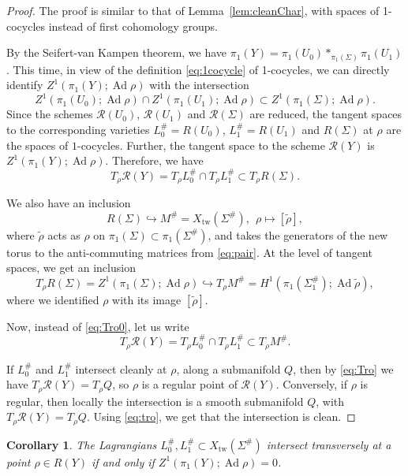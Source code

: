 \documentclass [11pt]{amsart}
\newtheorem {corollary}[theorem]{Corollary}
\theoremstyle{remark}
\def\Rep {R}
\def\Rs {\mathscr{R}}
\def\Ad {\operatorname{Ad}}
\def\Char {X}
\def\Xtw{\Char_{\operatorname{tw}}}
\begin{document}
\begin{proof}
The proof is similar to that of Lemma~\ref{lem:cleanChar}, with spaces of 1-cocycles instead of first cohomology groups.

By the Seifert-van Kampen theorem, we have $\pi_1(Y) = \pi_1(U_0) *_{\pi_1(\Sigma)} \pi_1(U_1)$. This time, in view of the definition \eqref{eq:1cocycle} of 1-cocycles, we can directly identify $Z^1(\pi_1(Y); \Ad \rho)$ with the intersection
$$ Z^1(\pi_1(U_0); \Ad \rho) \cap Z^1(\pi_1(U_1); \Ad \rho) \subset Z^1(\pi_1(\Sigma); \Ad \rho).$$
Since the schemes $\Rs(U_0)$, $\Rs(U_1)$ and $\Rs(\Sigma)$ are reduced, the tangent spaces to the corresponding varieties $L_0^{\#} = \Rep(U_0)$, $L_1^{\#}=\Rep(U_1)$ and $\Rep(\Sigma)$ at $\rho$ are the spaces of $1$-cocycles. Further, the tangent space to the scheme $\Rs(Y)$ is $Z^1(\pi_1(Y); \Ad \rho)$. Therefore, we have 
\begin{equation}
\label{eq:Tro0}
T_{\rho}\Rs(Y)= T_{\rho}L^{\#}_0 \cap T_{\rho}L^{\#}_1 \subset T_{\rho}\Rep(\Sigma).
\end{equation}

We also have an inclusion 
$$\Rep(\Sigma) \hookrightarrow M^{\#} =  \Xtw(\Sigma^{\#}), \ \ \rho \mapsto [\tilde \rho],$$
where $\tilde \rho$ acts as $\rho$ on $\pi_1(\Sigma) \subset \pi_1(\Sigma^{\#})$, and takes the generators of the new torus to the anti-commuting matrices from \eqref{eq:pair}. At the level of tangent spaces, we get an inclusion
$$ T_{\rho}\Rep(\Sigma) = Z^1(\pi_1(\Sigma); \Ad \rho) \hookrightarrow T_{\rho} M^{\#} =H^1(\pi_1(\Sigma_1^{\#}); \Ad \tilde\rho),$$
where we identified $\rho$ with its image $[\tilde \rho]$.

Now, instead of \eqref{eq:Tro0}, let us write
\begin{equation}
\label{eq:Tro}
T_{\rho}\Rs(Y)= T_{\rho}L^{\#}_0 \cap T_{\rho}L^{\#}_1 \subset T_{\rho}M^{\#}.
\end{equation}
 
 If $L^{\#}_0$ and $L^{\#}_1$ intersect cleanly at $\rho$, along a submanifold $Q$, then by \eqref{eq:Tro} we have $T_{\rho} \Rs(Y)= T_{\rho}Q$, so $\rho$ is a regular point of $\Rs(Y)$. Conversely, if $\rho$ is regular, then locally the intersection is a smooth submanifold $Q$, with $T_{\rho} \Rs(Y)= T_{\rho}Q$. Using \eqref{eq:tro}, we get that the intersection is clean.
\end{proof}


\begin{corollary}
\label{cor:transRep}
The Lagrangians $L^{\#}_0, L^{\#}_1 \subset \Xtw(\Sigma^{\#})$ intersect transversely at a point $\rho \in \Rep(Y)$ if and only if $Z^1(\pi_1(Y); \Ad \rho) = 0$.
\end{corollary}
\end{document}
